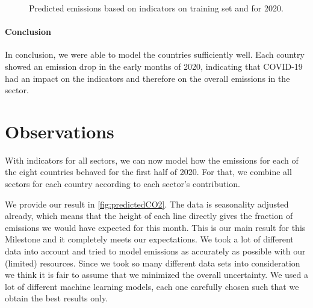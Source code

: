 \begin{figure}[h]
	\caption{Predicted emissions based on indicators on training set and for 2020.}
	\label{fig:mobility_pred}
\end{figure}	


\paragraph{Conclusion}

In conclusion, we were able to model the countries sufficiently well. Each country showed an emission drop in the early months of 2020, indicating that COVID-19 had an impact on the indicators and therefore on the overall emissions in the sector.

\section*{Observations}





With indicators for all sectors, we can now model how the \co emissions for each of the eight countries behaved for the first half of 2020. For that, we combine all sectors for each country according to each sector's contribution.


We provide our result in \autoref{fig:predictedCO2}. The data is seasonality adjusted already, which means that the height of each line directly gives the fraction of \co emissions we would have expected for this month. This is our main result for this Milestone and it completely meets our expectations. We took a lot of different data into account and tried to model \co emissions as accurately as possible with our (limited) resources. Since we took so many different data sets into consideration we think it is fair to assume that we minimized the overall uncertainty. We used a lot of different machine learning models, each one carefully chosen such that we obtain the best results only. 

